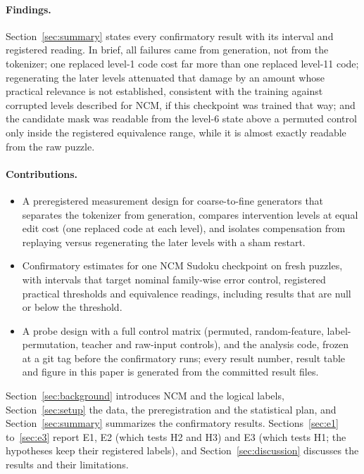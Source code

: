 \paragraph{Findings.} Section~\ref{sec:summary} states every confirmatory result with its interval and registered reading. In brief, all failures came from generation, not from the tokenizer; one replaced level-1 code cost far more than one replaced level-11 code; regenerating the later levels attenuated that damage by an amount whose practical relevance is not established, consistent with the training against corrupted levels described for NCM, if this checkpoint was trained that way; and the candidate mask was readable from the level-6 state above a permuted control only inside the registered equivalence range, while it is almost exactly readable from the raw puzzle.

\paragraph{Contributions.}
\begin{itemize}
\item A preregistered measurement design for coarse-to-fine generators that separates the tokenizer from generation, compares intervention levels at equal edit cost (one replaced code at each level), and isolates compensation from replaying versus regenerating the later levels with a sham restart.
\item Confirmatory estimates for one NCM Sudoku checkpoint on fresh puzzles, with intervals that target nominal family-wise error control, registered practical thresholds and equivalence readings, including results that are null or below the threshold.
\item A probe design with a full control matrix (permuted, random-feature, label-permutation, teacher and raw-input controls), and the analysis code, frozen at a git tag before the confirmatory runs; every result number, result table and figure in this paper is generated from the committed result files.
\end{itemize}

Section~\ref{sec:background} introduces NCM and the logical labels, Section~\ref{sec:setup} the data, the preregistration and the statistical plan, and Section~\ref{sec:summary} summarizes the confirmatory results. Sections~\ref{sec:e1} to~\ref{sec:e3} report E1, E2 (which tests H2 and H3) and E3 (which tests H1; the hypotheses keep their registered labels), and Section~\ref{sec:discussion} discusses the results and their limitations.
